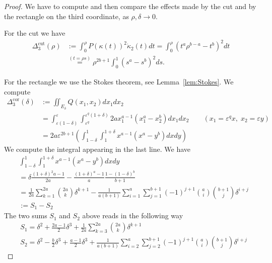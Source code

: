 \documentclass[12pt]{amsart}
\theoremstyle{plain}
\theoremstyle{definition}
\theoremstyle{remark}
\numberwithin{equation}{section}
\newcommand{\<}{\langle}
\renewcommand{\>}{\rangle}
\newcommand{\e}{\varepsilon}
\newcommand{\0}{\theta}
\renewcommand{\k}{\kappa}
\newcommand{\de}{\delta}
\newcommand{\De}{\Delta}
\newcommand{\1}{{-1}}
\newcommand{\cut}{\mathrm{cut}}
\newcommand{\cor}{\mathrm{cor}}
\renewcommand{\=}{\coloneqq}
\renewcommand{\.}{\dots}
\renewcommand{\-}{\cdot}
\renewcommand{\:}{\,:\,}
\renewcommand{\k}{\mathrm k}
\renewcommand{\k}{\kappa}
\theoremstyle{definition}
\begin{document}
\begin{proof}
	We have to compute and then compare the effects made by the cut and by the rectangle on the third coordinate, as $\rho,\de\to0$.
	
	For the cut we have
	\begin{equation}
		\label{eq:errk}
		\begin{split}
			\De^{\cut}_3(\rho)&:=\int_{0}^\rho P(\k(t))^2\dot\k_2(t)dt=\int_{0}^{\rho} (t^a\rho^{b-a}-t^b)^2dt\\
			&\stackrel{(t=\rho s)}{=}\rho^{2b+1}\int_{0}^{1} (s^a-s^b)^2ds.
		\end{split}
	\end{equation}

	For the rectangle we use the Stokes theorem, see Lemma~\ref{lem:Stokes}. We compute
	\begin{equation}
		\label{eq:errQ'}
		\begin{split}	
			\De_3^{\cor}(\de)&:=\iint_{E_\de} Q(x_1,x_2)dx_1dx_2\\
			&=\int_{\e(1-\de)}^\e\int_{\e^q}^{\e^q(1+\de)}2ax_1^{a-1}(x_1^a-x_2^b)dx_1dx_2 \qquad (x_1=\e^qx,\; x_2=\e y)\\
			&=2a\e^{2b+1}\left(\int_{1-\de}^1\int_{1}^{1+\de} x^{a-1}(x^a-y^b)dxdy\right)
		\end{split}
	\end{equation}
    We compute the integral appearing in the last line. We have
    \begin{equation}
        \label{eq:calcoloint1}
        \begin{split}
            &\int_{1-\de}^1\int_{1}^{1+\de} x^{a-1}(x^a-y^b)dxdy 
            \\
            &= \de\frac{(1+\de)^2a-1}{2a} - \frac{(1+\de)^a-1}{a}\frac{1-(1-\de)^b}{b+1}
            \\
            &=\frac{1}{2a} \sum_{k=1}^{2a}\binom{2a}{k}\de^{k+1} - 
            \frac{1}{a(b+1)} \sum_{i=1}^{a}\sum_{j=1}^{b+1}(-1)^{j+1}\binom{a}{i}\binom{b+1}{j}\de^{i+j}
            \\
            &:= S_1 - S_2
        \end{split}
    \end{equation}
    The two sums $S_1$ and $S_2$ above reads in the following way
    \begin{align}
        \label{eq:S1}&S_1 = \de^2 + \frac{2a-1}{2}\de^3 + \frac{1}{2a} \sum_{k=3}^{2a}\binom{2a}{k}\de^{k+1}
        \\
        \label{eq:S2}&S_2 = \de^2 - \frac b2\de^3 + \frac{a-1}{2} \de^3 + \frac{1}{a(b+1)} \sum_{i=2}^{a}\sum_{j=2}^{b+1}(-1)^{j+1}\binom{a}{i}\binom{b+1}{j}\de^{i+j}

\end{align}
\end{proof}
\end{document}
